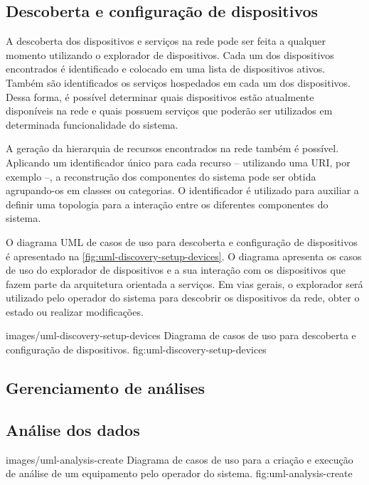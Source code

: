 \subsection{Descoberta e configuração de dispositivos}

A descoberta dos dispositivos e serviços na rede pode ser feita a qualquer momento utilizando o
explorador de dispositivos. Cada um dos dispositivos encontrados é identificado e colocado em uma
lista de dispositivos ativos. Também são identificados os serviços hospedados em cada um dos
dispositivos. Dessa forma, é possível determinar quais dispositivos estão atualmente disponíveis na
rede e quais possuem serviços que poderão ser utilizados em determinada funcionalidade do sistema.

A geração da hierarquia de recursos encontrados na rede também é possível. Aplicando um
identificador único para cada recurso -- utilizando uma \gls{URI}, por exemplo --, a reconstrução
dos componentes do sistema pode ser obtida agrupando-os em classes ou categorias. O identificador é
utilizado para auxiliar a definir uma topologia para a interação entre os diferentes componentes do
sistema.

O diagrama \gls{UML} de casos de uso para descoberta e configuração de dispositivos é apresentado na
\cref{fig:uml-discovery-setup-devices}. O diagrama apresenta os casos de uso do explorador de
dispositivos e a sua interação com os dispositivos que fazem parte da arquitetura orientada a
serviços. Em vias gerais, o explorador será utilizado pelo operador do sistema para descobrir os
dispositivos da rede, obter o estado ou realizar modificações.

    {images/uml-discovery-setup-devices}
    {Diagrama de casos de uso para descoberta e configuração de dispositivos.}
    {fig:uml-discovery-setup-devices}




\subsection{Gerenciamento de análises}


\subsection{Análise dos dados}

    {images/uml-analysis-create}
    {Diagrama de casos de uso para a criação e execução de análise de um equipamento pelo operador
        do sistema.}
    {fig:uml-analysis-create}
